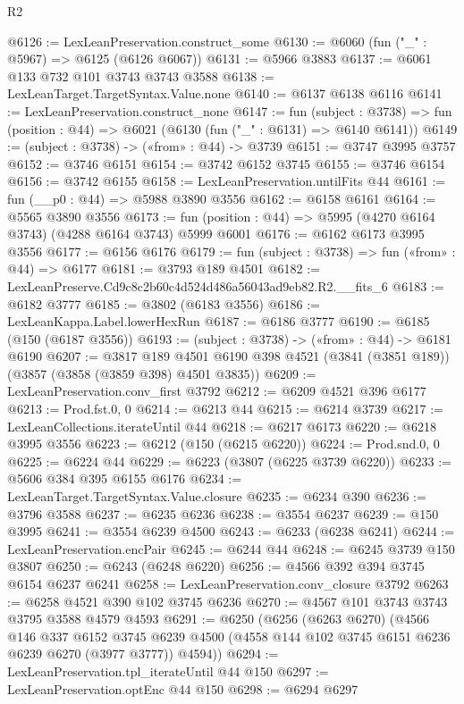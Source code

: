 \begin{lexlean}{R2}
\begin{coremodule}
@6126 := LexLeanPreservation.construct_some
@6130 := @6060 (fun ("_" : @5967) => @6125 (@6126 @6067))
@6131 := @5966 @3883
@6137 := @6061 @133 @732 @101 @3743 @3743 @3588
@6138 := LexLeanTarget.TargetSyntax.Value.none
@6140 := @6137 @6138 @6116
@6141 := LexLeanPreservation.construct_none
@6147 := fun (subject : @3738) =>
  fun (position : @44) => @6021 (@6130 (fun ("_" : @6131) => @6140 @6141))
@6149 := (subject : @3738) -> («from» : @44) -> @3739
@6151 := @3747 @3995 @3757
@6152 := @3746 @6151
@6154 := @3742 @6152 @3745
@6155 := @3746 @6154
@6156 := @3742 @6155
@6158 := LexLeanPreservation.untilFits @44
@6161 := fun (__p0 : @44) => @5988 @3890 @3556
@6162 := @6158 @6161
@6164 := @5565 @3890 @3556
@6173 := fun (position : @44) => @5995 (@4270 @6164 @3743) (@4288 @6164 @3743) @5999 @6001
@6176 := @6162 @6173 @3995 @3556
@6177 := @6156 @6176
@6179 := fun (subject : @3738) => fun («from» : @44) => @6177
@6181 := @3793 @189 @4501
@6182 := LexLeanPreserve.Cd9c8c2b60c4d524d486a56043ad9eb82.R2.__fits_6
@6183 := @6182 @3777
@6185 := @3802 (@6183 @3556)
@6186 := LexLeanKappa.Label.lowerHexRun
@6187 := @6186 @3777
@6190 := @6185 (@150 (@6187 @3556))
@6193 := (subject : @3738) -> («from» : @44) -> @6181 @6190
@6207 := @3817
    @189
    @4501
    @6190
    @398
    @4521
    (@3841 (@3851 @189))
    (@3857 (@3858 (@3859 @398) @4501 @3835))
@6209 := LexLeanPreservation.conv_first @3792
@6212 := @6209 @4521 @396 @6177
@6213 := Prod.fst.{0, 0}
@6214 := @6213 @44
@6215 := @6214 @3739
@6217 := LexLeanCollections.iterateUntil @44
@6218 := @6217 @6173
@6220 := @6218 @3995 @3556
@6223 := @6212 (@150 (@6215 @6220))
@6224 := Prod.snd.{0, 0}
@6225 := @6224 @44
@6229 := @6223 (@3807 (@6225 @3739 @6220))
@6233 := @5606 @384 @395 @6155 @6176
@6234 := LexLeanTarget.TargetSyntax.Value.closure
@6235 := @6234 @390
@6236 := @3796 @3588
@6237 := @6235 @6236
@6238 := @3554 @6237
@6239 := @150 @3995
@6241 := @3554 @6239 @4500
@6243 := @6233 (@6238 @6241)
@6244 := LexLeanPreservation.encPair
@6245 := @6244 @44
@6248 := @6245 @3739 @150 @3807
@6250 := @6243 (@6248 @6220)
@6256 := @4566 @392 @394 @3745 @6154 @6237 @6241
@6258 := LexLeanPreservation.conv_closure @3792
@6263 := @6258 @4521 @390 @102 @3745 @6236
@6270 := @4567 @101 @3743 @3743 @3795 @3588 @4579 @4593
@6291 := @6250
    (@6256
      (@6263 @6270)
      (@4566
        @146
        @337
        @6152
        @3745
        @6239
        @4500
        (@4558 @144 @102 @3745 @6151 @6236 @6239 @6270 (@3977 @3777))
        @4594))
@6294 := LexLeanPreservation.tpl_iterateUntil @44 @150
@6297 := LexLeanPreservation.optEnc @44 @150
@6298 := @6294 @6297

\end{coremodule}
\end{lexlean}
